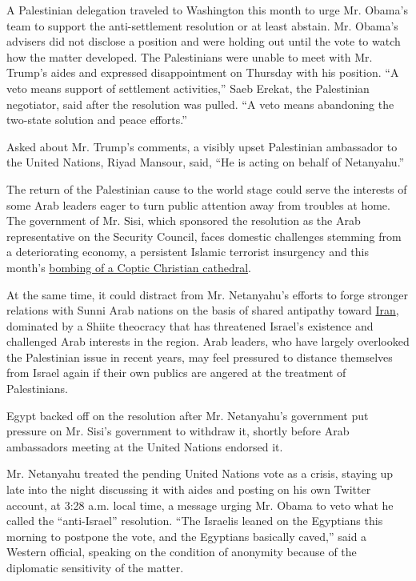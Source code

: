 A Palestinian delegation traveled to Washington this month to urge Mr.
Obama's team to support the anti-settlement resolution or at least
abstain. Mr. Obama's advisers did not disclose a position and were
holding out until the vote to watch how the matter developed. The
Palestinians were unable to meet with Mr. Trump's aides and expressed
disappointment on Thursday with his position. ``A veto means support of
settlement activities,'' Saeb Erekat, the Palestinian negotiator, said
after the resolution was pulled. ``A veto means abandoning the two-state
solution and peace efforts.''

Asked about Mr. Trump's comments, a visibly upset Palestinian ambassador
to the United Nations, Riyad Mansour, said, ``He is acting on behalf of
Netanyahu.''

The return of the Palestinian cause to the world stage could serve the
interests of some Arab leaders eager to turn public attention away from
troubles at home. The government of Mr. Sisi, which sponsored the
resolution as the Arab representative on the Security Council, faces
domestic challenges stemming from a deteriorating economy, a persistent
Islamic terrorist insurgency and this month's
\href{http://www.nytimes3xbfgragh.onion/2016/12/11/world/middleeast/cairo-coptic-cathedral-attack.html?ref=world\&_r=0}{bombing
of a Coptic Christian cathedral}.

At the same time, it could distract from Mr. Netanyahu's efforts to
forge stronger relations with Sunni Arab nations on the basis of shared
antipathy toward
\href{http://www.nytimes3xbfgragh.onion/topic/destination/iran}{Iran},
dominated by a Shiite theocracy that has threatened Israel's existence
and challenged Arab interests in the region. Arab leaders, who have
largely overlooked the Palestinian issue in recent years, may feel
pressured to distance themselves from Israel again if their own publics
are angered at the treatment of Palestinians.

Egypt backed off on the resolution after Mr. Netanyahu's government put
pressure on Mr. Sisi's government to withdraw it, shortly before Arab
ambassadors meeting at the United Nations endorsed it.

Mr. Netanyahu treated the pending United Nations vote as a crisis,
staying up late into the night discussing it with aides and posting on
his own Twitter account, at 3:28 a.m. local time, a message urging Mr.
Obama to veto what he called the ``anti-Israel'' resolution. ``The
Israelis leaned on the Egyptians this morning to postpone the vote, and
the Egyptians basically caved,'' said a Western official, speaking on
the condition of anonymity because of the diplomatic sensitivity of the
matter.

